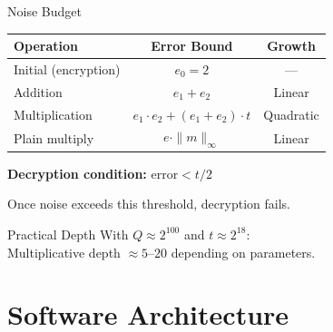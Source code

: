 \documentclass[aspectratio=169, 11pt]{beamer}
\begin{document}
\begin{frame}{Noise Budget}
\begin{center}
\begin{tabular}{lcc}
\toprule
\textbf{Operation} & \textbf{Error Bound} & \textbf{Growth} \\
\midrule
Initial (encryption) & $e_0 = 2$ & --- \\
Addition & $e_1 + e_2$ & Linear \\
Multiplication & $e_1 \cdot e_2 + (e_1 + e_2) \cdot t$ & Quadratic \\
Plain multiply & $e \cdot \|m\|_\infty$ & Linear \\
\bottomrule
\end{tabular}
\end{center}

\vspace{0.5em}
\textbf{Decryption condition:} $\text{error} < t/2$

\vspace{0.3em}
Once noise exceeds this threshold, decryption fails.

\vspace{0.5em}
\begin{block}{Practical Depth}
With $Q \approx 2^{100}$ and $t \approx 2^{18}$:\\
Multiplicative depth $\approx 5$--$20$ depending on parameters.
\end{block}
\end{frame}

\section{Software Architecture}
\end{document}
